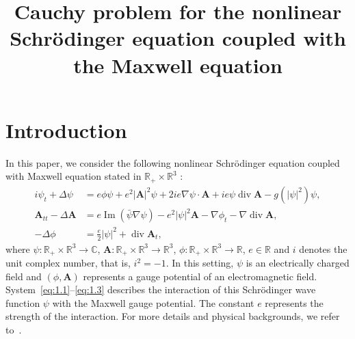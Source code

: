 \documentclass[AHL,Unicode,longabstracts]{cedram}
\title[Cauchy problem for the Schr\"odinger--Maxwell system]{Cauchy problem for the nonlinear Schr\"odinger equation coupled with the Maxwell equation}
\author[\initial{M.} \lastname{Colin}]{\firstname{Mathieu} \lastname{Colin}}
\author[\initial{T.} \lastname{Watanabe}]{\firstname{Tatsuya} \lastname{Watanabe}}
\newcommand{\BA}{\mathbf{A}}
\newcommand{\R}{\mathbb{R}}
\newcommand{\Com}{\mathbb{C}}
\DeclareMathOperator{\IM}{Im}
\DeclareMathOperator{\Div}{div}
\begin{document}
\maketitle

\section{Introduction}

In this paper, we consider the following nonlinear Schr\"odinger equation coupled with Maxwell equation stated in $\R_+\times \R^3$ :
\begin{align}
i \psi_t +\Delta \psi &= e \phi \psi +e^2 | \BA |^2 \psi +2ie \nabla \psi \cdot \BA +ie \psi \Div \BA - g(|\psi|^2)\psi, \label{eq:1.1}
\\
\BA_{tt}-\Delta \BA &= e \IM (\bar{\psi} \nabla \psi)-e^2|\psi|^2 \BA -
\nabla \phi_t - \nabla \Div \BA, \label{eq:1.2}
\\
-\Delta \phi &= \frac{e}{2} |\psi|^2 + \Div \BA_t, \label{eq:1.3}
\end{align}
where $\psi: \R_+\times \R^3 \to \Com$, $\BA: \R_+\times \R^3 \to \R^3$, $\phi: \R_+ \times \R^3 \to \R$, $e \in \R$ and $i$ denotes the unit complex number, that is, $i^2=-1$. In this setting, $\psi$ is an electrically charged field and $(\phi,\BA)$ represents a gauge potential of an electromagnetic field. System~\eqref{eq:1.1}--\eqref{eq:1.3} describes the interaction of this Schr\"odinger wave function $\psi$ with the Maxwell gauge potential. The constant $e$ represents the strength of the interaction. For more details and physical backgrounds, we refer to~\cite{F}.
\end{document}
